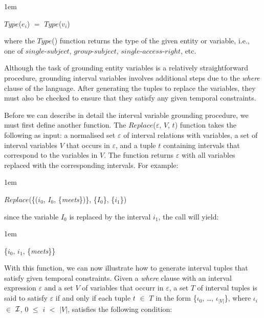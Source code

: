 \documentclass[11pt]{report}
\newenvironment{vquote}
{
  \begin{list}{}{\leftmargin 1em}\item[]
}
{
  \end{list}
}
\begin{document}
\begin{itemize}
              \begin{vquote}
                $Type$($e_i$) $=$ $Type$($v_i$)
              \end{vquote}

              \noindent
              where the $Type$() function returns the type of the given entity
              or variable, i.e., one of $single$-$subject$, $group$-$subject$,
              $single$-$access$-$right$, etc.

              Although the task of grounding entity variables is a relatively
              straightforward procedure, grounding interval variables involves
              additional steps due to the {\em where} clause of the language.
              After generating the tuples to replace the variables, they must
              also be checked to ensure that they satisfy any given temporal
              constraints.
            
              Before we can describe in detail the interval variable grounding
              procedure, we must first define another function. The
              $Replace$($\varepsilon$, $V$, $t$) function takes the following
              as input: a normalised set $\varepsilon$ of interval
              relations with variables, a set of interval variables $V$ that
              occurs in $\varepsilon$, and a tuple $t$ containing intervals
              that correspond to the variables in $V$. The function returns
              $\varepsilon$ with all variables replaced with the corresponding
              intervals. For example:
            
              \begin{vquote}
                $Replace$(\{($i_0$, $I_0$, \{{\em meets}\})\}, \{$I_0$\}, \{$i_1$\})
              \end{vquote}

              \noindent
              since the variable $I_0$ is replaced by the interval $i_1$, the
              call will yield:

              \begin{vquote}
                \{$i_0$, $i_1$, \{{\em meets}\}\} 
              \end{vquote}
            
              With this function, we can now illustrate how to generate
              interval tuples that satisfy given temporal constraints. Given a
              {\em where} clause with an interval expression $\varepsilon$ and
              a set $V$ of variables that occurr in $\varepsilon$, a set $T$ of
              interval tuples is said to satisfy $\varepsilon$ if and only if
              each tuple $t$ $\in$ $T$ in the form \{${\iota}_0$, \ldots,
              ${\iota}_{|V|}$\}, where ${\iota}_i$ $\in$ ${\cal I}$, $0$ $\leq$
              $i$ $<$ $|V|$, satisfies the following condition:


\end{itemize}
\end{document}
